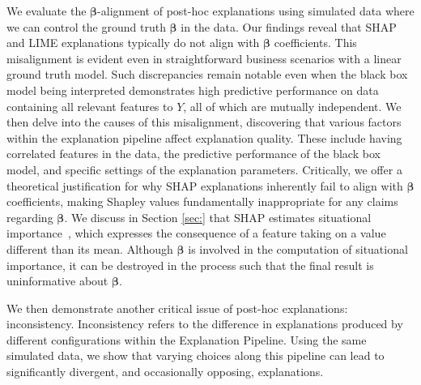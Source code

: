 \documentclass[mnsc,blindrev]{informs3}
\begin{document}
We evaluate the $\boldsymbol{\beta}$-alignment of post-hoc explanations using simulated data where we can control the ground truth $\boldsymbol{\beta}$ in the data. Our findings reveal that SHAP and LIME explanations typically do not align with $\boldsymbol{\beta}$ coefficients. This misalignment is evident even in straightforward business scenarios with a linear ground truth model. Such discrepancies remain notable even when the black box model being interpreted demonstrates high predictive performance on data containing all relevant features to $Y$, all of which are mutually independent. We then delve into the causes of this misalignment, discovering that various factors within the explanation pipeline affect explanation quality. These include having correlated features in the data, the predictive performance of the black box model, and specific settings of the explanation parameters. Critically, we offer a theoretical justification for why SHAP explanations inherently fail to align with $\boldsymbol{\beta}$ coefficients, making Shapley values fundamentally inappropriate for any claims regarding $\boldsymbol{\beta}$. We discuss in Section \ref{sec:} that SHAP estimates situational importance~\citep{StrumbeljErik2014Epma}, 
 which expresses the consequence of a feature taking on a value different than its mean. Although $\boldsymbol{\beta}$ is involved in the computation of situational importance, it can be destroyed in the process such that the final result is uninformative about $\boldsymbol{\beta}$.%


We then demonstrate another critical issue of post-hoc explanations: inconsistency. Inconsistency refers to the difference in explanations produced by different configurations within the Explanation Pipeline. Using the same simulated data, we show that varying choices along this pipeline can lead to significantly divergent, and occasionally opposing, explanations.
\end{document}
